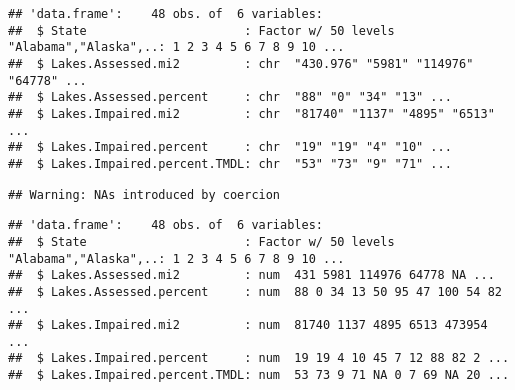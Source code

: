 \documentclass[]{article}
\newenvironment{Shaded}{\begin{snugshade}}{\end{snugshade}}
\newcommand{\KeywordTok}[1]{\textcolor[rgb]{0.13,0.29,0.53}{\textbf{#1}}}
\newcommand{\NormalTok}[1]{#1}
\newcommand{\OperatorTok}[1]{\textcolor[rgb]{0.81,0.36,0.00}{\textbf{#1}}}
\newcommand{\StringTok}[1]{\textcolor[rgb]{0.31,0.60,0.02}{#1}}
\begin{document}
\begin{verbatim}
## 'data.frame':    48 obs. of  6 variables:
##  $ State                      : Factor w/ 50 levels "Alabama","Alaska",..: 1 2 3 4 5 6 7 8 9 10 ...
##  $ Lakes.Assessed.mi2         : chr  "430.976" "5981" "114976" "64778" ...
##  $ Lakes.Assessed.percent     : chr  "88" "0" "34" "13" ...
##  $ Lakes.Impaired.mi2         : chr  "81740" "1137" "4895" "6513" ...
##  $ Lakes.Impaired.percent     : chr  "19" "19" "4" "10" ...
##  $ Lakes.Impaired.percent.TMDL: chr  "53" "73" "9" "71" ...
\end{verbatim}

\begin{Shaded}
\end{Shaded}

\begin{verbatim}
## Warning: NAs introduced by coercion
\end{verbatim}

\begin{Shaded}
\end{Shaded}

\begin{verbatim}
## 'data.frame':    48 obs. of  6 variables:
##  $ State                      : Factor w/ 50 levels "Alabama","Alaska",..: 1 2 3 4 5 6 7 8 9 10 ...
##  $ Lakes.Assessed.mi2         : num  431 5981 114976 64778 NA ...
##  $ Lakes.Assessed.percent     : num  88 0 34 13 50 95 47 100 54 82 ...
##  $ Lakes.Impaired.mi2         : num  81740 1137 4895 6513 473954 ...
##  $ Lakes.Impaired.percent     : num  19 19 4 10 45 7 12 88 82 2 ...
##  $ Lakes.Impaired.percent.TMDL: num  53 73 9 71 NA 0 7 69 NA 20 ...
\end{verbatim}
\end{document}
